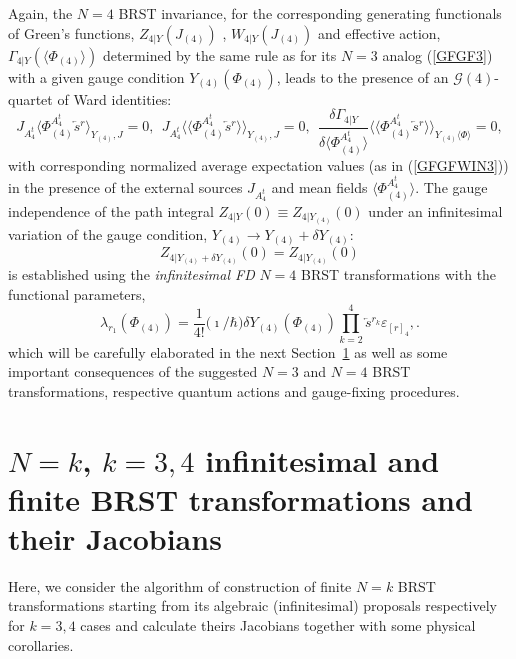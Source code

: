 \documentclass[10pt]{article}
\begin{document}
Again, the  $N=4$  BRST invariance, for the corresponding generating functionals
of Green's functions, ${Z}_{4|Y}({J}_{(4)})$ , ${W}_{4|Y}({J}_{(4)})$ and effective action, $\Gamma_{4|Y}(\langle{\Phi}_{(4)}\rangle)$ determined by the same rule as for its $N=3$ analog (\ref{GFGF3})
with a given gauge condition $Y_{(4)}({\Phi}_{(4)})$,
leads to the presence of an $\mathcal{G}(4)$-quartet of Ward identities:
\begin{equation}\label{GFGFWIN4}
{J}_{A^t_4}\langle {\Phi}{}^{A^t_4}_{(4)}\overleftarrow{s}{}^r\rangle_{Y_{(4)},{J}}=0, \ \ {J}_{A^t_4}\langle\langle {\Phi}^{A^t_4}_{(4)} \overleftarrow{s}{}^r\rangle\rangle_{Y_{(4)},{J}}=0, \ \ \frac{\delta \Gamma_{4|Y}}{\delta \langle {\Phi}^{A^t_4}_{(4)}\rangle}\langle\langle {\Phi}{}^{A^t_4}_{(4)} \overleftarrow{s}{}^r\rangle\rangle_{Y_{(4)} \langle {\Phi}\rangle} =0,
 \end{equation}
with corresponding normalized  average expectation values (as in  (\ref{GFGFWIN3}))  in the presence of the external sources ${J}_{A^t_4}$ and mean fields
$\langle {\Phi}{}^{A^t_4}_{(4)}\rangle$. The gauge independence of the path integral $Z_{4|Y}(0)\equiv Z_{4|Y_{(4)}}(0)$
under an infinitesimal variation of the gauge condition, $Y_{(4)} \to Y_{(4)}+\delta Y_{(4)}$:
\begin{equation}\label{N4GIinf}
  Z_{4|Y_{(4)}+\delta Y_{(4)}}(0) =     Z_{4|Y_{(4)}}(0)
\end{equation}
is established using the \emph{infinitesimal FD} $N=4$ BRST transformations
 with the functional parameters,
  \begin{equation}\label{N4FDP}
 \lambda_{r_1}({\Phi}_{(4)})= \frac{1}{4!}\big(\imath / \hbar\big) \delta Y_{(4)}({\Phi}_{(4)}) \prod_{k=2}^4\overleftarrow{s}{}^{r_k}\varepsilon_{[r]_4},
.\end{equation}
 which will be carefully  elaborated    in the next Section~\ref{N=kgauge} as well as
  some important consequences of the suggested $N=3$ and $N=4$   BRST transformations,
 respective quantum actions and gauge-fixing procedures.

\section{$N=k$,  $k=3,4$ infinitesimal and finite BRST transformations and their Jacobians} \label{N=kgauge}

 \setcounter{equation}{0}

Here, we consider  the algorithm of construction of finite  $N=k$  BRST transformations starting from its algebraic (infinitesimal) proposals respectively for $k=3, 4$ cases and calculate theirs Jacobians together with some  physical corollaries.
\end{document}
